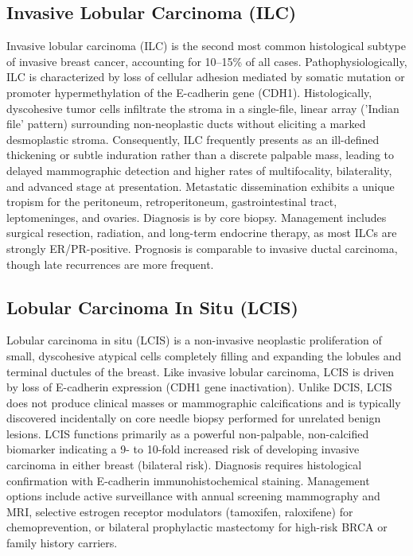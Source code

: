 \subsection{Invasive Lobular Carcinoma (ILC)}
\label{sec:Invasive Lobular Carcinoma (ILC)}
Invasive lobular carcinoma (ILC) is the second most common histological subtype of invasive breast cancer, accounting for 10--15\% of all cases. Pathophysiologically, ILC is characterized by loss of cellular adhesion mediated by somatic mutation or promoter hypermethylation of the E-cadherin gene (CDH1). Histologically, dyscohesive tumor cells infiltrate the stroma in a single-file, linear array ('Indian file' pattern) surrounding non-neoplastic ducts without eliciting a marked desmoplastic stroma. Consequently, ILC frequently presents as an ill-defined thickening or subtle induration rather than a discrete palpable mass, leading to delayed mammographic detection and higher rates of multifocality, bilaterality, and advanced stage at presentation. Metastatic dissemination exhibits a unique tropism for the peritoneum, retroperitoneum, gastrointestinal tract, leptomeninges, and ovaries. Diagnosis is by core biopsy. Management includes surgical resection, radiation, and long-term endocrine therapy, as most ILCs are strongly ER/PR-positive. Prognosis is comparable to invasive ductal carcinoma, though late recurrences are more frequent.

\subsection{Lobular Carcinoma In Situ (LCIS)}
\label{sec:Lobular Carcinoma In Situ (LCIS)}
Lobular carcinoma in situ (LCIS) is a non-invasive neoplastic proliferation of small, dyscohesive atypical cells completely filling and expanding the lobules and terminal ductules of the breast. Like invasive lobular carcinoma, LCIS is driven by loss of E-cadherin expression (CDH1 gene inactivation). Unlike DCIS, LCIS does not produce clinical masses or mammographic calcifications and is typically discovered incidentally on core needle biopsy performed for unrelated benign lesions. LCIS functions primarily as a powerful non-palpable, non-calcified biomarker indicating a 9- to 10-fold increased risk of developing invasive carcinoma in either breast (bilateral risk). Diagnosis requires histological confirmation with E-cadherin immunohistochemical staining. Management options include active surveillance with annual screening mammography and MRI, selective estrogen receptor modulators (tamoxifen, raloxifene) for chemoprevention, or bilateral prophylactic mastectomy for high-risk BRCA or family history carriers.

